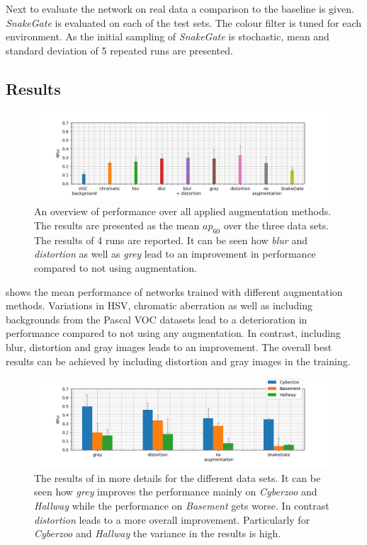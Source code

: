 Next to evaluate the network on real data a comparison to the baseline is given. \textit{SnakeGate} is evaluated on each of the test sets. The colour filter is tuned for each environment. As the initial sampling of \textit{SnakeGate} is stochastic, mean and standard deviation of 5 repeated runs are presented.

\subsection{Results}

\begin{figure}[hbtp]
	\includegraphics[width=\textwidth]{fig/augmentation_overview}
	\caption{An overview of performance over all applied augmentation methods. The results are presented as the mean $ap_{60}$ over the three data sets. The results of 4 runs are reported. It can be seen how \textit{blur} and \textit{distortion} as well as \textit{grey} lead to an improvement in performance compared to not using augmentation.}
	\label{fig:augmentation_overview}
\end{figure}

 shows the mean performance of networks trained with different augmentation methods. Variations in \ac{HSV}, chromatic aberration as well as including backgrounds from the Pascal VOC datasets lead to a deterioration in performance compared to not using any augmentation. In contrast, including blur, distortion and gray images leads to an improvement. The overall best results can be achieved by including distortion and gray images in the training.

\begin{figure}[hbtp]
	\includegraphics[width=\textwidth]{fig/augmentation}
	\caption{The results of  in more details for the different data sets. It can be seen how \textit{grey} improves the performance mainly on \textit{Cyberzoo} and \textit{Hallway} while the performance on \textit{Basement} gets worse. In contrast \textit{distortion} leads to a more overall improvement. Particularly for \textit{Cyberzoo} and \textit{Hallway} the variance in the results is high.}
	\label{fig:augmentation}
\end{figure}


